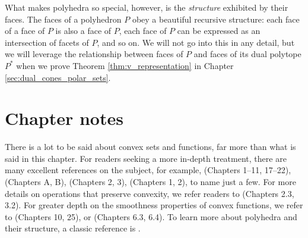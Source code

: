 What makes polyhedra so special, however, is the \emph{structure} exhibited by
their faces. The faces of a polyhedron $P$ obey a beautiful recursive 
structure: each face of a face of $P$ is also a face of $P$, each face of $P$
can be expressed as an intersection of facets of $P$, and so on. 
We will not go into this in any detail, but we will leverage the relationship
between faces of $P$ and faces of its dual polytope $P^*$ when we prove
Theorem \ref{thm:v_representation} in Chapter \ref{sec:dual_cones_polar_sets}. 

\SkipTocEntry\section*{Chapter notes}

There is a lot to be said about convex sets and functions, far more than what is
said in this chapter. For readers seeking a more in-depth treatment, there are
many excellent references on the subject, for example,
\cite{rockafellar1970convex} (Chapters 1--11, 17--22),
\cite{hiriartUrruty2001fundamentals} (Chapters A, B), \cite{boyd2004convex}
(Chapters 2, 3), \cite{bertsekas2009convex} (Chapters 1, 2), to name just a
few. For more details on operations that preserve convexity, we refer readers to 
\cite{boyd2004convex} (Chapters 2.3, 3.2). For greater depth on the smoothness
properties of convex functions, we refer to \cite{rockafellar1970convex}
(Chapters 10, 25), or \cite{evans2015measure} (Chapters 6.3, 6.4). To learn more
about polyhedra and their structure, a classic reference is
\cite{grunbaum2003convex}.  

